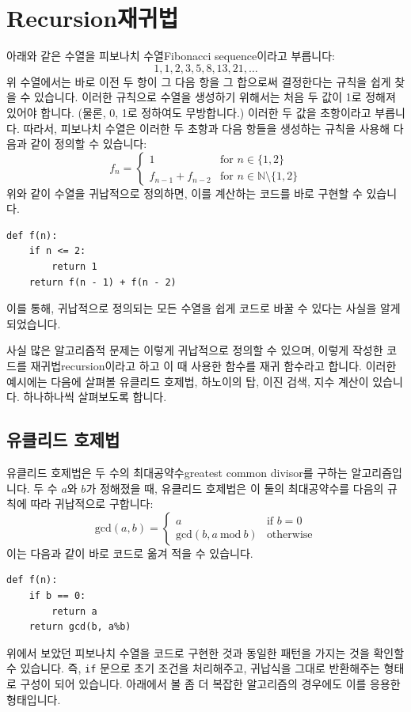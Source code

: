 \documentclass[../main.tex]{subfiles}
\begin{document}
\section{Recursion재귀법}
아래와 같은 수열을 피보나치 수열Fibonacci sequence이라고 부릅니다:
\[
1, 1, 2, 3, 5, 8, 13, 21, \dots
\]
위 수열에서는 바로 이전 두 항이 그 다음 항을 그 합으로써 결정한다는 규칙을 쉽게 찾을 수 있습니다.
이러한 규칙으로 수열을 생성하기 위해서는 처음 두 값이 1로 정해져 있어야 합니다.
(물론, 0, 1로 정하여도 무방합니다.)
이러한 두 값을 초항이라고 부릅니다.
따라서, 피보나치 수열은 이러한 두 초항과 다음 항들을 생성하는 규칙을 사용해 다음과 같이 정의할 수 있습니다:
\[
f_n = \begin{cases}
1 & \text{for $n \in \{1, 2\}$}\\
f_{n - 1} + f_{n - 2} & \text{for $n \in \mathbb{N} \setminus \{1, 2\}$}
\end{cases}
\]
위와 같이 수열을 귀납적으로 정의하면, 이를 계산하는 코드를 바로 구현할 수 있습니다.
\begin{verbatim}
def f(n):
    if n <= 2:
        return 1
    return f(n - 1) + f(n - 2)
\end{verbatim}
이를 통해, 귀납적으로 정의되는 모든 수열을 쉽게 코드로 바꿀 수 있다는 사실을 알게 되었습니다.

사실 많은 알고리즘적 문제는 이렇게 귀납적으로 정의할 수 있으며, 이렇게 작성한 코드를 재귀법recursion이라고 하고 이 때 사용한 함수를 재귀 함수라고 합니다.
이러한 예시에는 다음에 살펴볼 유클리드 호제법, 하노이의 탑, 이진 검색, 지수 계산이 있습니다.
하나하나씩 살펴보도록 합니다.

\subsection{유클리드 호제법}
유클리드 호제법은 두 수의 최대공약수greatest common divisor를 구하는 알고리즘입니다.
두 수 $a$와 $b$가 정해졌을 때, 유클리드 호제법은 이 둘의 최대공약수를 다음의 규칙에 따라 귀납적으로 구합니다:
\[
\mathrm{gcd}(a, b) = \begin{cases}
a & \text{if }b = 0\\
\mathrm{gcd}(b, a\ \mathrm{mod}\ b) & \text{otherwise}
\end{cases}
\]
이는 다음과 같이 바로 코드로 옮겨 적을 수 있습니다.
\begin{verbatim}
def f(n):
    if b == 0:
        return a
    return gcd(b, a%b)
\end{verbatim}
위에서 보았던 피보나치 수열을 코드로 구현한 것과 동일한 패턴을 가지는 것을 확인할 수 있습니다.
즉, \texttt{if} 문으로 초기 조건을 처리해주고, 귀납식을 그대로 반환해주는 형태로 구성이 되어 있습니다.
아래에서 볼 좀 더 복잡한 알고리즘의 경우에도 이를 응용한 형태입니다.
\end{document}
